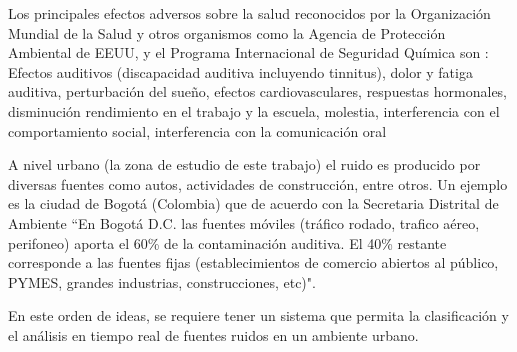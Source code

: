 Los principales efectos adversos sobre la salud reconocidos por la Organización Mundial de la Salud y otros organismos como la Agencia de Protección Ambiental de EEUU, y el Programa Internacional de Seguridad Química son : Efectos auditivos (discapacidad auditiva incluyendo tinnitus), dolor y fatiga auditiva, perturbación del sueño, efectos cardiovasculares, respuestas hormonales, disminución rendimiento en el trabajo y la escuela, molestia, interferencia con el comportamiento social, interferencia con la comunicación oral

A nivel urbano (la zona de estudio de este trabajo) el ruido es producido por diversas fuentes como autos, actividades de construcción, entre otros.  Un ejemplo es la ciudad de Bogotá (Colombia) que de acuerdo con la Secretaria Distrital de Ambiente\cite{Ambiente} ``En Bogotá D.C. las fuentes móviles (tráfico rodado, trafico aéreo, perifoneo) aporta el 60\% de la contaminación auditiva. El 40\% restante corresponde a las fuentes fijas (establecimientos de comercio abiertos al público, PYMES, grandes industrias, construcciones, etc)".

En este orden de ideas, se requiere tener un sistema que permita la clasificación y el análisis en tiempo real de fuentes ruidos en un ambiente urbano. 
